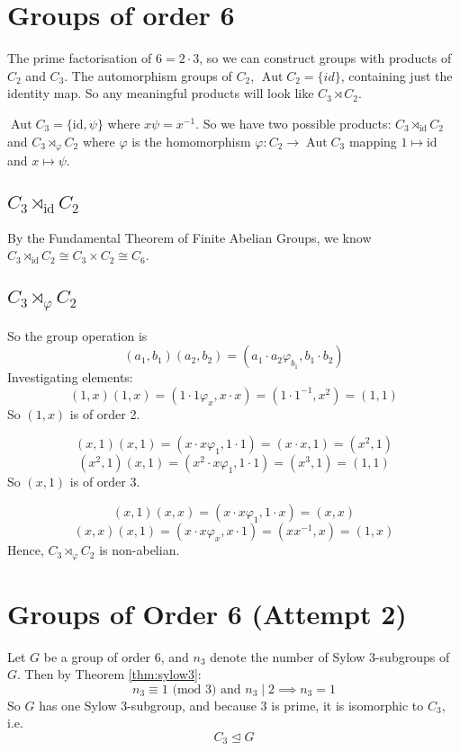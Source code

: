 \documentclass[a4paper, oneside, 12pt, final]{article}
\theoremstyle{definition}
\DeclareMathOperator{\Aut}{Aut}
\begin{document}
\section{Groups of order 6}
The prime factorisation of \(6 = 2 \cdot 3\), so we can construct groups with
products of \(C_2\) and \(C_3\). The automorphism groups of \(C_2\),
\(\Aut{C_2} = \{id\}\), containing just the identity map. So any meaningful
products will look like \(C_3 \rtimes C_2\).

\(\Aut{C_3} = \{\text{id}, \psi\}\) where \(x\psi = x^{-1}\).
So we have two possible products: \(C_3 {\rtimes}_{\text{id}} C_2\) and \(C_3
{\rtimes}_{\varphi} C_2\) where \(\varphi\) is the homomorphism \(\varphi:C_2
\to \Aut{C_3}\) mapping \(1 \mapsto \text{id}\) and \(x \mapsto \psi\).

\subsection{\(C_3 \rtimes_\text{id} C_2\)}
By the Fundamental Theorem of Finite Abelian Groups, we know \( C_3
\rtimes_\text{id} C_2 \cong C_3 \times C_2 \cong C_6\).

\subsection{\(C_3 \rtimes_\varphi C_2\)}
So the group operation is
\[(a_1, b_1)(a_2, b_2) = (a_1\cdot a_2\varphi_{b_1}, b_1\cdot b_2)\]
Investigating elements:
\[(1,x)(1,x) = (1 \cdot 1\varphi_x, x \cdot x) = (1 \cdot 1^{-1}, x^2) = (1,
1)\]
So \((1, x)\) is of order 2.

\[(x, 1)(x, 1) = (x \cdot x\varphi_1, 1 \cdot 1) = (x \cdot x, 1) = (x^2, 1)\]
\[(x^2, 1)(x, 1) = (x^2 \cdot x\varphi_1, 1 \cdot 1) = (x^3, 1) = (1, 1)\]
So \((x, 1)\) is of order 3.

\[(x, 1)(x, x) = (x \cdot x\varphi_1, 1 \cdot x) = (x, x)\]
\[(x, x)(x, 1) = (x \cdot x\varphi_x, x \cdot 1) = (xx^{-1}, x) = (1, x)\]
Hence, \(C_3 \rtimes_\varphi C_2\) is non-abelian.

\section{Groups of Order 6 (Attempt 2)}
Let \(G\) be a group of order 6, and \(n_3\) denote the number of Sylow
3-subgroups of \(G\).
Then by Theorem \ref{thm:sylow3}:
\[n_3 \equiv 1 \text{ (mod 3) and } n_3 \mid 2 \implies n_3 = 1\]
So \(G\) has one Sylow 3-subgroup, and because 3 is prime, it is isomorphic to
\(C_3\), i.e.
\[C_3 \unlhd G\]
\end{document}
